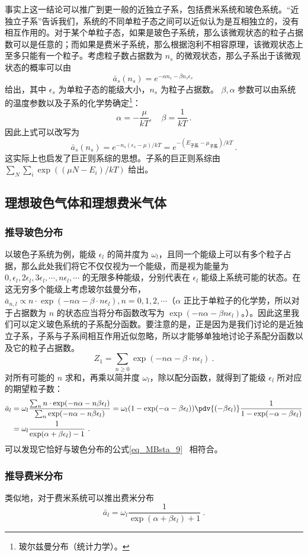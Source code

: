 事实上这一结论可以推广到更一般的近独立子系，包括费米系统和玻色系统。“近独立子系”告诉我们，系统的不同单粒子态之间可以近似认为是互相独立的，没有相互作用的。对于某个单粒子态，如果是玻色子系统，那么该微观状态的粒子占据数可以是任意的；而如果是费米子系统，那么根据泡利不相容原理，该微观状态上至多只能有一个粒子。考虑粒子数占据数为 $n_s$ 的微观状态，那么子系出于该微观状态的概率可以由 
\begin{equation}
\bar a_s(n_s) =  e^{-\alpha n_s-\beta n_s \epsilon_s}~
\end{equation}
给出，其中 $\epsilon_s$ 为单粒子态的能级大小，$n_s$ 为粒子占据数。
$\beta,\alpha$ 参数可以由系统的温度参数以及子系的化学势确定\footnote{玻尔兹曼分布（统计力学）。}：
\begin{equation}
\alpha=-\frac{\mu}{kT},\quad \beta=\frac{1}{kT}~.
\end{equation}
因此上式可以改写为
\begin{equation}
\bar a_s(n_s)= e^{-n_s(\epsilon_s-\mu)/kT}= e^{-(E_\text{子系}-\mu_\text{子系})/kT}~.
\end{equation}
这实际上也启发了巨正则系综的思想。子系的巨正则系综由 $\sum_N \sum_i \exp((\mu N-E_i)/kT)$ 给出。

\subsection{理想玻色气体和理想费米气体}
\subsubsection{推导玻色分布}
以玻色子系统为例，能级 $\epsilon_l$ 的简并度为 $\omega_l$，且同一个能级上可以有多个粒子占据，那么此处我们将它不仅仅视为一个能级，而是视为能量为 $0,\epsilon_l,2\epsilon_l,3\epsilon_l,\cdots, n\epsilon_l,\cdots$ 的无限多种能级，分别代表在 $\epsilon_l$ 能级上系统可能的状态。在这无穷多个能级上考虑玻尔兹曼分布，$\bar{a}_{n,l} \propto n\cdot \exp(-n\alpha-\beta\cdot n\epsilon_l),n=0,1,2,\cdots $（$\alpha$ 正比于单粒子的化学势，所以对于占据数为 $n$ 的状态应当将分布函数改写为 $\exp(-n\alpha-\beta n\epsilon_l)$。）。因此这里我们可以定义玻色系统的子系配分函数。要注意的是，正是因为是我们讨论的是近独立子系，子系与子系间相互作用近似忽略，所以才能够单独地讨论子系配分函数以及它的粒子占据数。
\begin{equation}
Z_1=\sum_{n\ge 0} \exp(-n\alpha-\beta\cdot n\epsilon_l)~.
\end{equation}
对所有可能的 $n$ 求和，再乘以简并度 $\omega_l$，除以配分函数，就得到了能级 $\epsilon_l$ 所对应的期望粒子数：
\begin{equation}\label{eq_depsys_1}
\begin{aligned}
\bar a_l&=\omega_l \frac{\sum_n n\cdot \exp(-n\alpha-n\beta\epsilon_l)}{\sum_n \exp(-n\alpha-n\beta\epsilon_l)}=\omega_l (1-\exp(-\alpha-\beta\epsilon_l)) \pdv{(-\beta\epsilon_l)} \frac{1}{1-\exp(-\alpha-\beta\epsilon_l)}\\
&=\omega_l \frac{1}{\exp(\alpha+\beta\epsilon_l)-1}~.
\end{aligned}
\end{equation}
可以发现它恰好与玻色分布的公式\autoref{eq_MBsta_9}~ 相符合。
\subsubsection{推导费米分布}
类似地，对于费米系统可以推出费米分布
\begin{equation}
\bar a_l=\omega_l \frac{1}{\exp(\alpha+\beta\epsilon_l)+1}~.
\end{equation}
